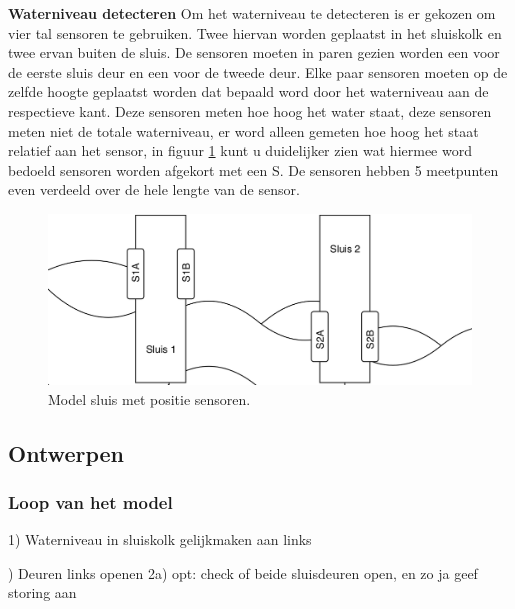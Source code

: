 \documentclass{article}
\begin{document}
\noindent\textbf{Waterniveau detecteren}\newline
\newline Om het waterniveau te detecteren is er gekozen om vier tal sensoren te gebruiken. Twee hiervan worden geplaatst in het sluiskolk en twee ervan buiten de sluis. De sensoren moeten in paren gezien worden een voor de eerste sluis deur en een voor de tweede deur. Elke paar sensoren moeten op de zelfde hoogte geplaatst worden dat bepaald word door het waterniveau aan de respectieve kant. Deze sensoren meten hoe hoog het water staat, deze sensoren meten niet de totale waterniveau, er word alleen gemeten hoe hoog het staat relatief aan het sensor, in figuur \ref{fig:sluiceSensoren} kunt u duidelijker zien wat hiermee word bedoeld sensoren worden afgekort met een S. De sensoren hebben 5 meetpunten even verdeeld over de hele lengte van de sensor.
\begin{figure}[!h]
	\centering
	\includegraphics[width=\textwidth]{images/sluis_sensoren.png}
    \caption{Model sluis met positie sensoren.}
	\label{fig:sluiceSensoren}
\end{figure} \newpage



\subsection{Ontwerpen}

\subsubsection{Loop van het model}

1) Waterniveau in sluiskolk gelijkmaken aan links \newline 

) Deuren links openen \newline
2a) opt: check of beide sluisdeuren open, en zo ja geef storing aan \newline 
\end{document}
